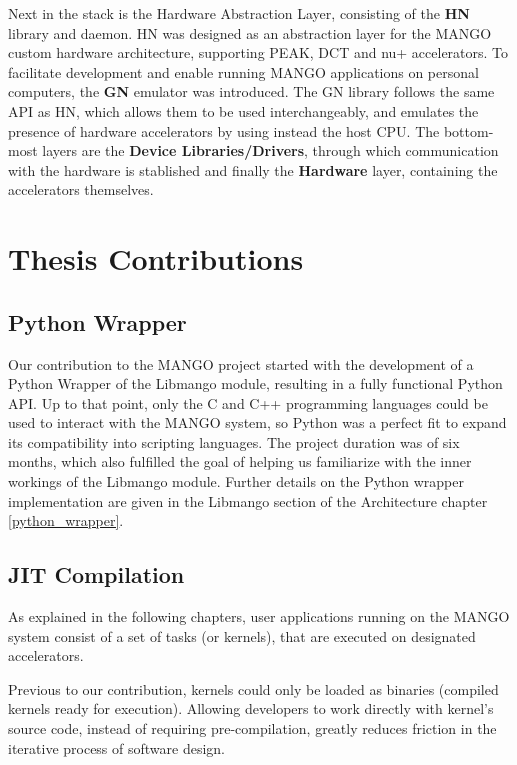 Next in the stack is the Hardware Abstraction Layer, consisting of the \textbf{HN} library and daemon. HN was designed as an abstraction layer for the MANGO custom hardware architecture, supporting PEAK, DCT and nu+ accelerators. To facilitate development and enable running MANGO applications on personal computers, the \textbf{GN} emulator was introduced. The GN library follows the same API as HN, which allows them to be used interchangeably, and emulates the presence of hardware accelerators by using instead the host CPU.
The bottom-most layers are the \textbf{Device Libraries/Drivers}, through which communication with the hardware is stablished and finally the \textbf{Hardware} layer, containing the accelerators themselves.

\section{Thesis Contributions}
\subsection{Python Wrapper}

Our contribution to the MANGO project started with the development of a Python Wrapper of the Libmango module, resulting in a fully functional Python API. Up to that point, only the C and C++ programming languages could be used to interact with the MANGO system, so Python was a perfect fit to expand its compatibility into scripting languages. The project duration was of six months, which also fulfilled the goal of helping us familiarize with the inner workings of the Libmango module. Further details on the Python wrapper implementation are given in the Libmango section of the Architecture chapter \ref{python_wrapper}.

\subsection{JIT Compilation}

As explained in the following chapters, user applications running on the MANGO system consist of a set of tasks (or kernels), that are executed on designated accelerators. 

Previous to our contribution, kernels could only be loaded as binaries (compiled kernels ready for execution). 
Allowing developers to work directly with kernel's source code, instead of requiring pre-compilation, greatly reduces friction in the iterative process of software design.

